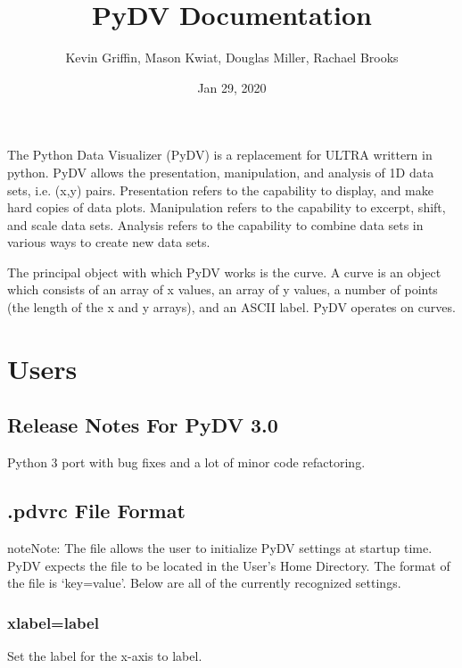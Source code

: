 \documentclass[letterpaper,10pt,english]{sphinxmanual}
\title{PyDV Documentation}
\date{Jan 29, 2020}
\author{Kevin Griffin, Mason Kwiat, Douglas Miller, Rachael Brooks}
\begin{document}
\pagestyle{empty}
\sphinxmaketitle
\pagestyle{plain}
\sphinxtableofcontents
\pagestyle{normal}
\label{\detokenize{index::doc}}


The Python Data Visualizer (PyDV) is a replacement for ULTRA writtern in python. PyDV allows the presentation, manipulation, and analysis of 1D data sets, i.e. (x,y) pairs. Presentation refers to the capability to display, and make hard copies of data plots. Manipulation refers to the capability to excerpt, shift, and scale data sets. Analysis refers to the capability to combine data sets in various ways to create new data sets.

The principal object with which PyDV works is the curve. A curve is an object which consists of an array of x values, an array of y values, a number of points (the length of the x and y arrays), and an ASCII label. PyDV operates on curves.


\chapter{Users}
\label{\detokenize{index:users}}

\section{Release Notes For PyDV 3.0}
\label{\detokenize{release_notes_3.0:release-notes-for-pydv-3-0}}\label{\detokenize{release_notes_3.0:release-notes-3-0}}\label{\detokenize{release_notes_3.0::doc}}
Python 3 port with bug fixes and a lot of minor code refactoring.


\section{.pdvrc File Format}
\label{\detokenize{pdvrc:pdvrc-file-format}}\label{\detokenize{pdvrc:pdvrc}}\label{\detokenize{pdvrc::doc}}
\begin{sphinxadmonition}{note}{Note:}
The  file allows the user to initialize PyDV settings at startup time. PyDV expects the  file to be located in the User’s Home Directory. The format of the  file is ‘key=value’. Below are all of the currently recognized settings.
\end{sphinxadmonition}


\subsection{xlabel=label}
\label{\detokenize{pdvrc:xlabel-label}}
Set the label for the x-axis to label.
\end{document}
